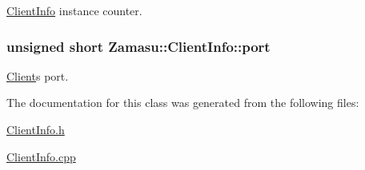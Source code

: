 \hyperlink{class_zamasu_1_1_client_info}{Client\+Info} instance counter. 

\subsubsection[{\texorpdfstring{port}{port}}]{\setlength{\rightskip}{0pt plus 5cm}unsigned short Zamasu\+::\+Client\+Info\+::port\hspace{0.3cm}{\ttfamily [protected]}}\hypertarget{class_zamasu_1_1_client_info_a0072d23fd63fbd8e831556940bd69ce1}{}\label{class_zamasu_1_1_client_info_a0072d23fd63fbd8e831556940bd69ce1}


\hyperlink{class_zamasu_1_1_client}{Client}\textquotesingle{}s port. 



The documentation for this class was generated from the following files\+:\begin{DoxyCompactItemize}
\item 
\hyperlink{_client_info_8h}{Client\+Info.\+h}\item 
\hyperlink{_client_info_8cpp}{Client\+Info.\+cpp}\end{DoxyCompactItemize}
